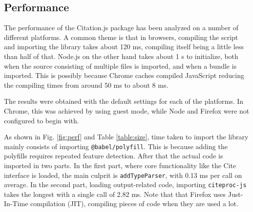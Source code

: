 \documentclass[fleqn,10pt,lineno]{wlpeerj} %
\begin{document}
\subsection*{Performance}

The performance of the Citation.js package has been analyzed on a number of different platforms. A common theme is that in browsers, compiling the script and importing the library takes about 120 ms, compiling itself being a little less than half of that. Node.js on the other hand takes about 1 s to initialize, both when the source consisting of multiple files is imported, and when a bundle is imported. This is possibly because Chrome caches compiled JavaScript reducing the compiling times from around 50 ms to about 8 ms.

The results were obtained with the default settings for each of the platforms. In Chrome, this was achieved by using guest mode, while Node and Firefox were not configured to begin with.

As shown in Fig. \ref{fig:perf} and Table \ref{table:size}, time taken to import the library mainly consists of importing \texttt{@babel/polyfill}. This is because adding the polyfills requires repeated feature detection. After that the actual code is imported in two parts. In the first part, where core functionality like the Cite interface is loaded, the main culprit is \texttt{addTypeParser}, with 0.13 ms per call on average. In the second part, loading output-related code, importing \texttt{citeproc-js} takes the longest with a single call of 2.82 ms.
Note that that Firefox uses Just-In-Time compilation (JIT), compiling pieces of code when they are used a lot.
\end{document}
